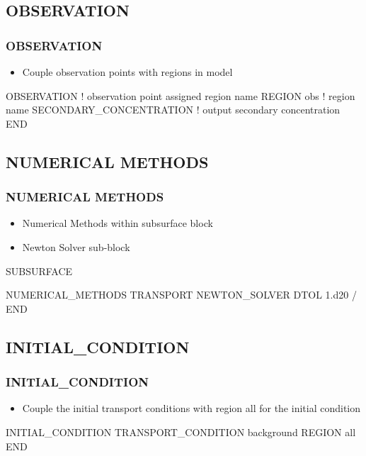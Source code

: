 \documentclass{beamer}
\newcommand\bluecomment[1]{{{\color{blue} #1}}}
\newcommand\greencomment[1]{{{\color{green} #1}}}
\newcommand\magentacomment[1]{{{\color{magenta} #1}}}
\begin{document}
\subsection{OBSERVATION}

\begin{frame}[fragile]\frametitle{OBSERVATION}

\begin{itemize}
\item Couple observation points with regions in model
\end{itemize}

\begin{semiverbatim}
OBSERVATION  \bluecomment{! observation point assigned region name}
  REGION obs  \bluecomment{! region name}
  \magentacomment{SECONDARY_CONCENTRATION}\bluecomment{! output secondary concentration}
END

\end{semiverbatim}

\end{frame}

\subsection{NUMERICAL METHODS}

\begin{frame}[fragile]\frametitle{NUMERICAL METHODS}

\begin{itemize}
  \item Numerical Methods within subsurface block
  \item Newton Solver sub-block
\end{itemize}

\begin{semiverbatim}
SUBSURFACE

NUMERICAL_METHODS TRANSPORT
  NEWTON_SOLVER
    DTOL 1.d20
  /
END
\end{semiverbatim}

\end{frame}

\subsection{INITIAL\_CONDITION}

\begin{frame}[fragile]\frametitle{INITIAL\_CONDITION}

\begin{itemize}
\item Couple the \greencomment{initial} transport conditions with region \greencomment{all} for the initial condition
\end{itemize}

\begin{semiverbatim}

INITIAL_CONDITION
  TRANSPORT_CONDITION background
  REGION all
END

\end{semiverbatim}

\end{frame}
\end{document}
